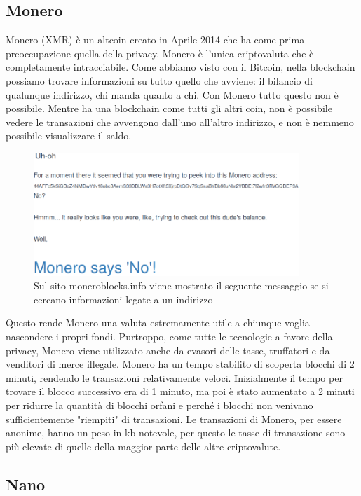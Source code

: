 \documentclass {article}
\begin{document}
\subsection {Monero}


Monero (XMR) è un altcoin creato in Aprile 2014 che ha come prima preoccupazione quella della privacy.
Monero è l'unica criptovaluta che è completamente intracciabile. Come abbiamo visto con il Bitcoin, nella blockchain possiamo trovare informazioni su tutto quello che avviene: il bilancio di qualunque indirizzo, chi manda quanto a chi.
Con Monero tutto questo non è possibile. Mentre ha una blockchain come tutti gli altri coin, non è possibile vedere le transazioni che avvengono dall'uno all'altro indirizzo, e non è nemmeno possibile visualizzare il saldo.

\vspace {0.5cm}
\begin{figure}[htb!]
\includegraphics [width = 10cm] {monero.png}
\centering
\caption {Sul sito moneroblocks.info viene mostrato il seguente messaggio se si cercano informazioni legate a un indirizzo}
\end{figure}
\vspace {0.2cm}
\noindent
%
Questo rende Monero una valuta estremamente utile a chiunque voglia nascondere i propri fondi.
Purtroppo, come tutte le tecnologie a favore della privacy, Monero viene utilizzato anche da evasori delle tasse, truffatori e da venditori di merce illegale.
Monero ha un tempo stabilito di scoperta blocchi di 2 minuti, rendendo le transazioni relativamente veloci.
Inizialmente il tempo per trovare il blocco successivo era di 1 minuto, ma poi è stato aumentato a 2 minuti per ridurre la quantità di blocchi orfani e perché i blocchi non venivano sufficientemente "riempiti" di transazioni.
Le transazioni di Monero, per essere anonime, hanno un peso in kb notevole, per questo le tasse di transazione sono più elevate di quelle della maggior parte delle altre criptovalute. %

\subsection {Nano}
\end{document}
